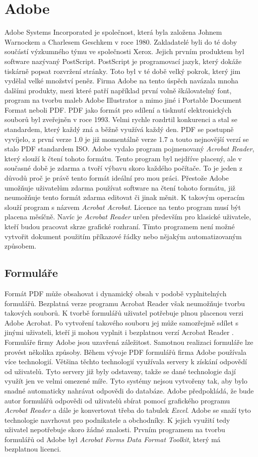 \documentclass[czech,BP]{thesiskiv}
\begin{document}
\section{Adobe}
Adobe Systems Incorporated je společnost, která byla založena Johnem Warnockem a Charlesem Geschkem  v roce 1980. Zakladatelé byli do té doby součástí výzkumného týmu ve společnosti Xerox. Jejich prvním produktem byl software nazývaný PostScript. PostScript je programovací jazyk, který dokáže tiskárně popsat rozvržení stránky. Toto byl v té době velký pokrok, který jim vydělal velké množství peněz. Firma Adobe na tento úspěch navázala mnoha dalšími produkty, mezi které patří například první volně škálovatelný font, program na tvorbu maleb Adobe Illustrator a mimo jiné i Portable Document Format neboli PDF\cite{Adobe_story}. 
PDF jako formát pro sdílení a tisknutí elektronických souborů byl zveřejněn v roce 1993. Velmi rychle rozdrtil konkurenci a stal se standardem, který každý zná a běžně využívá každý den. PDF se postupně vyvíjelo, z první verze 1.0 je již momentálně verze 1.7 a touto nejnovější verzí se stalo PDF standardem ISO. Adobe vydalo program pojmenovaný \emph{Acrobat Reader}, který slouží k čtení tohoto formátu. Tento program byl nejdříve placený, ale v současné době je zdarma a tvoří výbavu skoro každého počítače. To je jeden z důvodů proč je právě tento formát ideální pro mou práci\cite{Adobe_history}.
Přestože Adobe umožňuje uživatelům zdarma používat software na čtení tohoto formátu, již neumožňuje tento formát zdarma editovat či jinak měnit. K takovým operacím slouží program s názvem \emph{Acrobat Acrobat}. Licence na tento program musí být placena měsíčně. Navíc je \emph{Acrobat Reader} určen především pro klasické uživatele, kteří budou pracovat skrze grafické rozhraní. Tímto programem není možné vytvořit dokument použitím příkazové řádky nebo nějakým automatizovaným způsobem. 

\subsection{Formuláře}
Formát PDF může obsahovat i dynamický obsah v podobě vyplnitelných formulářů. Bezplatná verze programu Acrobat Reader však neumožňuje tvorbu takových souborů. K tvorbě formulářů uživatel potřebuje plnou placenou verzi Adobe Acrobat. Po vytvoření takového souboru jej může samozřejmě sdílet s jinými uživateli, kteří ji mohou vyplnit i bezplatnou verzí Acrobat Reader \cite{Adobe_forms}. 
Formuláře firmy Adobe jsou uzavřená záležitost. Samotnou realizaci formuláře lze provést několika způsoby. Během vývoje PDF formulářů firma Adobe používala více technologií. Většina těchto technologií využívala servery k získání odpovědí od uživatelů. Tyto servery již byly odstaveny, takže se dané technologie dají využít jen ve velmi omezené míře. Tyto systémy nejsou vytvořeny tak, aby bylo snadné automaticky nahrávat odpovědi do databáze. Adobe předpokládá, že bude autor formulářů odpovědi od uživatelů sbírat pomocí grafického programu \emph{Acrobat Reader} a dále je konvertovat třeba do tabulek \emph{Excel}. Adobe se snaží tyto technologie navrhovat pro podnikatele a obchodníky. K jejich využití tedy uživatel nepotřebuje skoro žádné znalosti. Prvním programem na tvorbu formulářů od Adobe byl \emph{Acrobat Forms Data Format Toolkit}, který má bezplatnou licenci.
\end{document}
